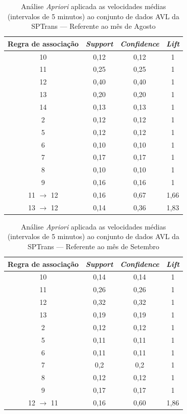 \documentclass[
	12pt,				%
	oneside,			%
	a4paper,			%
	english,			%
	brazil				%
	]{abntex2ppgsi}
\begin{document}
{{\begin{apendicesenv}
\begin{table}[!htb]
\centering
\caption {Análise \textit{Apriori} aplicada as velocidades médias (intervalos de 5 minutos) ao conjunto de dados AVL da SPTrans --- Referente ao mês de Agosto}
\label {tab:aprioriAugust}
\begin{tabular}{c|c|c|c}
\toprule
\textbf{Regra de associação} & \textit{\textbf{Support}} & \textit{\textbf{Confidence}} & \textit{\textbf{Lift}} \\
\midrule
10 &  0,12 &  0,12 &  1\\
\hline
11 &  0,25 &  0,25 &  1\\
\hline
12 &  0,40 &  0,40 &  1\\
\hline
13 &  0,20 &  0,20 &  1\\
\hline
14 &  0,13 &  0,13 &  1\\
\hline
2 &  0,12 &  0,12 &  1\\
\hline
5 &  0,12 &  0,12 &  1\\
\hline
6 &  0,10 &  0,10 &  1\\
\hline
7 &  0,17 &  0,17 &  1\\
\hline
8 &  0,10 &  0,10 &  1\\
\hline
9 &  0,16 &  0,16 &  1\\
\hline
11 $\rightarrow$ 12 &  0,16 &  0,67 &  1,66\\
\hline
13 $\rightarrow$ 12 &  0,14 &  0,36 &  1,83\\
\bottomrule
\end{tabular}
\end{table}

\begin{table}[!htb]
\centering
\caption {Análise \textit{Apriori} aplicada as velocidades médias (intervalos de 5 minutos) ao conjunto de dados AVL da SPTrans --- Referente ao mês de Setembro}
\label {tab:aprioriSeptember}
\begin{tabular}{c|c|c|c}
\toprule
\textbf{Regra de associação} & \textit{\textbf{Support}} & \textit{\textbf{Confidence}} & \textit{\textbf{Lift}} \\
\midrule
10 &  0,14 &  0,14 &  1\\
\hline
11 &  0,26 &  0,26 &  1\\
\hline
12 &  0,32 &  0,32 &  1\\
\hline
13 &  0,19 &  0,19 &  1\\
\hline
2 &  0,12 &  0,12 &  1\\
\hline
5 &  0,11 &  0,11 &  1\\
\hline
6 &  0,11 &  0,11 &  1\\
\hline
7 &  0,2 &  0,2 &  1\\
\hline
8 &  0,12 &  0,12 &  1\\
\hline
9 &  0,17 &  0,17 &  1\\
\hline
12 $\rightarrow$ 11 &  0,16 &  0,60 &  1,86\\
\bottomrule
\end{tabular}
\end{table}



\end{apendicesenv}}}
\end{document}
